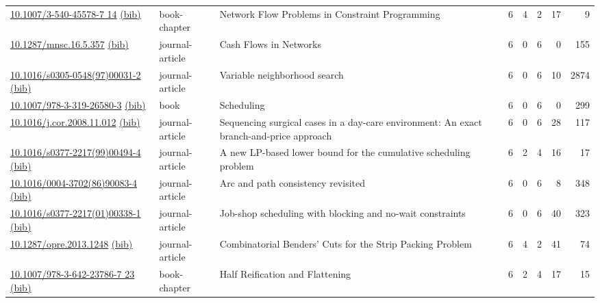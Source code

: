 {\begin{longtable}{p{5cm}lp{11cm}rrrrr}
\href{http://dx.doi.org/10.1007/3-540-45578-7_14}{10.1007/3-540-45578-7 14} \href{https://www.doi2bib.org/bib/10.1007/3-540-45578-7_14}{(bib)} & book-chapter & Network Flow Problems in Constraint Programming & 6 & 4 & 2 & 17 & 9 \\
\href{http://dx.doi.org/10.1287/mnsc.16.5.357}{10.1287/mnsc.16.5.357} \href{https://www.doi2bib.org/bib/10.1287/mnsc.16.5.357}{(bib)} & journal-article & Cash Flows in Networks & 6 & 0 & 6 & 0 & 155 \\
\href{http://dx.doi.org/10.1016/s0305-0548(97)00031-2}{10.1016/s0305-0548(97)00031-2} \href{https://www.doi2bib.org/bib/10.1016/s0305-0548(97)00031-2}{(bib)} & journal-article & Variable neighborhood search & 6 & 0 & 6 & 10 & 2874 \\
\href{http://dx.doi.org/10.1007/978-3-319-26580-3}{10.1007/978-3-319-26580-3} \href{https://www.doi2bib.org/bib/10.1007/978-3-319-26580-3}{(bib)} & book & Scheduling & 6 & 0 & 6 & 0 & 299 \\
\href{http://dx.doi.org/10.1016/j.cor.2008.11.012}{10.1016/j.cor.2008.11.012} \href{https://www.doi2bib.org/bib/10.1016/j.cor.2008.11.012}{(bib)} & journal-article & Sequencing surgical cases in a day-care environment: An exact branch-and-price approach & 6 & 0 & 6 & 28 & 117 \\
\href{http://dx.doi.org/10.1016/s0377-2217(99)00494-4}{10.1016/s0377-2217(99)00494-4} \href{https://www.doi2bib.org/bib/10.1016/s0377-2217(99)00494-4}{(bib)} & journal-article & A new LP-based lower bound for the cumulative scheduling problem & 6 & 2 & 4 & 16 & 17 \\
\href{http://dx.doi.org/10.1016/0004-3702(86)90083-4}{10.1016/0004-3702(86)90083-4} \href{https://www.doi2bib.org/bib/10.1016/0004-3702(86)90083-4}{(bib)} & journal-article & Arc and path consistency revisited & 6 & 0 & 6 & 8 & 348 \\
\href{http://dx.doi.org/10.1016/s0377-2217(01)00338-1}{10.1016/s0377-2217(01)00338-1} \href{https://www.doi2bib.org/bib/10.1016/s0377-2217(01)00338-1}{(bib)} & journal-article & Job-shop scheduling with blocking and no-wait constraints & 6 & 0 & 6 & 40 & 323 \\
\href{http://dx.doi.org/10.1287/opre.2013.1248}{10.1287/opre.2013.1248} \href{https://www.doi2bib.org/bib/10.1287/opre.2013.1248}{(bib)} & journal-article & Combinatorial Benders' Cuts for the Strip Packing Problem & 6 & 4 & 2 & 41 & 74 \\
\href{http://dx.doi.org/10.1007/978-3-642-23786-7_23}{10.1007/978-3-642-23786-7 23} \href{https://www.doi2bib.org/bib/10.1007/978-3-642-23786-7_23}{(bib)} & book-chapter & Half Reification and Flattening & 6 & 2 & 4 & 17 & 15 \\

\end{longtable}}
